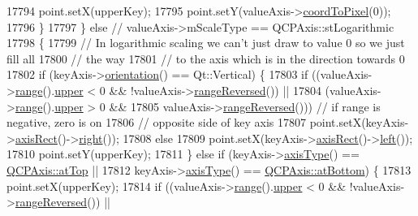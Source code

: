 \begin{DoxyCode}
17794       point.setX(upperKey);
17795       point.setY(valueAxis->\hyperlink{class_q_c_p_axis_a985ae693b842fb0422b4390fe36d299a}{coordToPixel}(0));
17796     \}
17797   \} \textcolor{keywordflow}{else} \textcolor{comment}{// valueAxis->mScaleType == QCPAxis::stLogarithmic}
17798   \{
17799     \textcolor{comment}{// In logarithmic scaling we can't just draw to value 0 so we just fill all}
17800     \textcolor{comment}{// the way}
17801     \textcolor{comment}{// to the axis which is in the direction towards 0}
17802     \textcolor{keywordflow}{if} (keyAxis->\hyperlink{class_q_c_p_axis_a57483f2f60145ddc9e63f3af53959265}{orientation}() == Qt::Vertical) \{
17803       \textcolor{keywordflow}{if} ((valueAxis->\hyperlink{class_q_c_p_axis_ab1ea79a4f5ea4cf42620f8f51c477ac4}{range}().\hyperlink{class_q_c_p_range_ae44eb3aafe1d0e2ed34b499b6d2e074f}{upper} < 0 && !valueAxis->\hyperlink{class_q_c_p_axis_ade26dc7994ccd8a11f64fd83377ee021}{rangeReversed}()) ||
17804           (valueAxis->\hyperlink{class_q_c_p_axis_ab1ea79a4f5ea4cf42620f8f51c477ac4}{range}().\hyperlink{class_q_c_p_range_ae44eb3aafe1d0e2ed34b499b6d2e074f}{upper} > 0 &&
17805            valueAxis->\hyperlink{class_q_c_p_axis_ade26dc7994ccd8a11f64fd83377ee021}{rangeReversed}())) \textcolor{comment}{// if range is negative, zero is on}
17806                                         \textcolor{comment}{// opposite side of key axis}
17807         point.setX(keyAxis->\hyperlink{class_q_c_p_axis_aada3102af43b029e3879bcbf2bddfabb}{axisRect}()->\hyperlink{class_q_c_p_axis_rect_a6d0f989fc552aa2b563cf82f8fc81e61}{right}());
17808       \textcolor{keywordflow}{else}
17809         point.setX(keyAxis->\hyperlink{class_q_c_p_axis_aada3102af43b029e3879bcbf2bddfabb}{axisRect}()->\hyperlink{class_q_c_p_axis_rect_a55b3ecf72a3a65b053f7651b88db458d}{left}());
17810       point.setY(upperKey);
17811     \} \textcolor{keywordflow}{else} \textcolor{keywordflow}{if} (keyAxis->\hyperlink{class_q_c_p_axis_a593c37bf6aa4990326dc09e24f45db7f}{axisType}() == \hyperlink{class_q_c_p_axis_ae2bcc1728b382f10f064612b368bc18aac0ece2b680d3f545e701f75af1655977}{QCPAxis::atTop} ||
17812                keyAxis->\hyperlink{class_q_c_p_axis_a593c37bf6aa4990326dc09e24f45db7f}{axisType}() == \hyperlink{class_q_c_p_axis_ae2bcc1728b382f10f064612b368bc18aa220d68888516b6c3b493d144f1ba438f}{QCPAxis::atBottom}) \{
17813       point.setX(upperKey);
17814       \textcolor{keywordflow}{if} ((valueAxis->\hyperlink{class_q_c_p_axis_ab1ea79a4f5ea4cf42620f8f51c477ac4}{range}().\hyperlink{class_q_c_p_range_ae44eb3aafe1d0e2ed34b499b6d2e074f}{upper} < 0 && !valueAxis->\hyperlink{class_q_c_p_axis_ade26dc7994ccd8a11f64fd83377ee021}{rangeReversed}()) ||

\end{DoxyCode}
